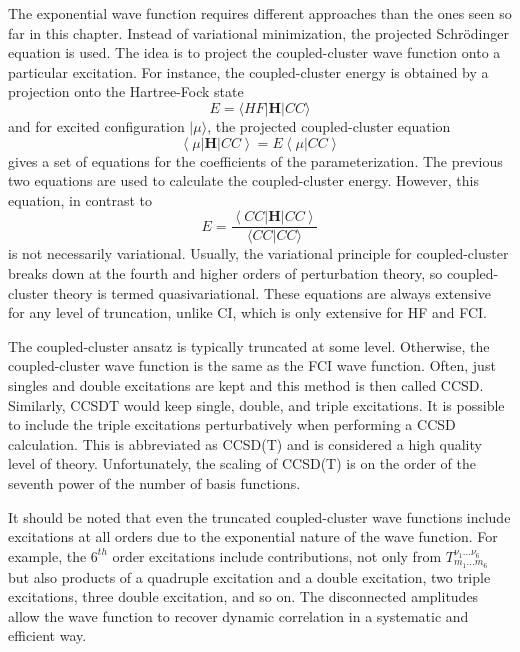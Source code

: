 \documentclass[11pt,oneside,final]{huthesis}%
\begin{document}
 The exponential wave function requires different approaches than the ones seen so far in this chapter.  Instead of variational minimization, the {projected Schr{\"o}dinger equation} is used.  The idea is to project the coupled-cluster wave function onto a particular excitation.  For instance, the coupled-cluster energy is obtained by a projection onto the Hartree-Fock state
\begin{equation} \label{GrindEQ__4_} 
E=\langle HF\left|{\mathbf H}\right|CC\rangle
\end{equation} 
and for excited configuration $|\mu \rangle$, the projected coupled-cluster equation
\begin{equation} \label{GrindEQ__5_} 
\left\langle \mu \left|{\mathbf H}\right|CC\right\rangle =E\left\langle \mu |CC\right\rangle  
\end{equation} 
gives a set of equations for the coefficients of the parameterization.
The previous two equations are used to calculate the coupled-cluster energy.  However, this equation, in contrast to $$E=\frac{\left\langle CC\left|{\mathbf H}\right|CC\right\rangle }{\langle CC|CC\rangle}$$ is not necessarily variational. Usually, the variational principle for coupled-cluster breaks down at the fourth and higher orders of perturbation theory, so coupled-cluster theory is termed {quasivariational}.  These equations are always extensive for any level of truncation, unlike CI, which is only extensive for HF and FCI. 

The coupled-cluster ansatz is typically truncated at some level. Otherwise, the coupled-cluster wave function is the same as the FCI wave function.  Often, just singles and double excitations are kept and this method is then called CCSD.  Similarly, CCSDT would keep single, double, and triple excitations.  It is possible to include the triple excitations perturbatively when performing a CCSD calculation.  This is abbreviated as CCSD(T) and is considered a high quality level of theory.  Unfortunately, the scaling of CCSD(T) is on the order of the seventh power of the number of basis functions.

It should be noted that even the truncated coupled-cluster wave functions include excitations at all orders due to the exponential nature of the wave function.  For example, the $6^{th}$ order excitations include contributions, not only from $T_{m_1...m_6}^{\nu_1...\nu_6}$ but also products of a quadruple excitation and a double excitation, two triple excitations, three double excitation, and so on.  The disconnected amplitudes allow the wave function to recover dynamic correlation in a systematic and efficient way.    
\end{document}
